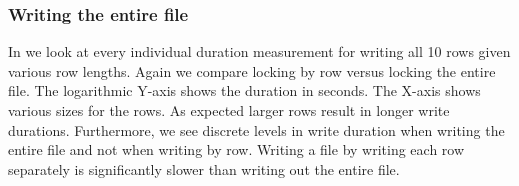 \clearpage
\subsubsection*{Writing the entire file}
In  we look at every individual duration measurement for writing all 10 rows given various row lengths. Again we compare locking by row versus locking the entire file. The logarithmic Y-axis shows the duration in seconds. The X-axis shows various sizes for the rows. As expected larger rows result in longer write durations. Furthermore, we see discrete levels in write duration when writing the entire file and not when writing by row. Writing a file by writing each row separately is significantly slower than writing out the entire file.
%

